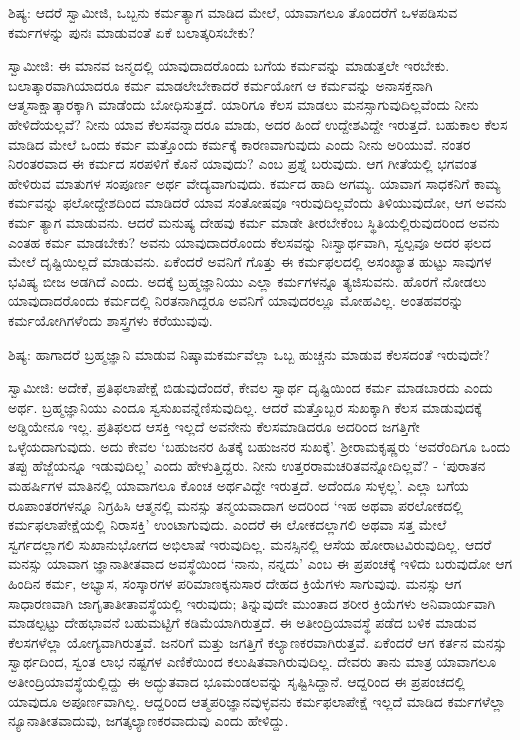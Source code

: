 ಶಿಷ್ಯ: ಆದರೆ ಸ್ವಾಮೀಜಿ, ಒಬ್ಬನು ಕರ್ಮತ್ಯಾಗ ಮಾಡಿದ ಮೇಲೆ, ಯಾವಾಗಲೂ ತೊಂದರೆಗೆ ಒಳಪಡಿಸುವ ಕರ್ಮಗಳನ್ನು ಪುನಃ ಮಾಡುವಂತೆ ಏಕೆ ಬಲಾತ್ಕರಿಸಬೇಕು?

ಸ್ವಾಮೀಜಿ: ಈ ಮಾನವ ಜನ್ಮದಲ್ಲಿ ಯಾವುದಾದರೊಂದು ಬಗೆಯ ಕರ್ಮವನ್ನು ಮಾಡುತ್ತಲೇ ಇರಬೇಕು. ಬಲಾತ್ಕಾರವಾಗಿಯಾದರೂ ಕರ್ಮ ಮಾಡಲೇಬೇಕಾದರೆ ಕರ್ಮಯೋಗ ಆ ಕರ್ಮವನ್ನು ಅನಾಸಕ್ತನಾಗಿ ಆತ್ಮಸಾಕ್ಷಾತ್ಕಾರಕ್ಕಾಗಿ ಮಾಡೆಂದು ಬೋಧಿಸುತ್ತದೆ. ಯಾರಿಗೂ ಕೆಲಸ ಮಾಡಲು ಮನಸ್ಸಾಗುವುದಿಲ್ಲವೆಂದು ನೀನು ಹೇಳಿದೆಯಲ್ಲವೆ? ನೀನು ಯಾವ ಕೆಲಸವನ್ನಾದರೂ ಮಾಡು, ಅದರ ಹಿಂದೆ ಉದ್ದೇಶವಿದ್ದೇ ಇರುತ್ತದೆ. ಬಹುಕಾಲ ಕೆಲಸ ಮಾಡಿದ ಮೇಲೆ ಒಂದು ಕರ್ಮ ಮತ್ತೊಂದು ಕರ್ಮಕ್ಕೆ ಕಾರಣವಾಗುವುದು ಎಂದು ನೀನು ಅರಿಯುವೆ. ನಂತರ ನಿರಂತರವಾದ ಈ ಕರ್ಮದ ಸರಪಳಿಗೆ ಕೊನೆ ಯಾವುದು? ಎಂಬ ಪ್ರಶ್ನೆ ಬರುವುದು. ಆಗ ಗೀತೆಯಲ್ಲಿ ಭಗವಂತ ಹೇಳಿರುವ ಮಾತುಗಳ ಸಂಪೂರ್ಣ ಅರ್ಥ ವೇದ್ಯವಾಗುವುದು. ಕರ್ಮದ ಹಾದಿ ಅಗಮ್ಯ. ಯಾವಾಗ ಸಾಧಕನಿಗೆ ಕಾಮ್ಯ ಕರ್ಮವನ್ನು ಫಲೋದ್ದೇಶದಿಂದ ಮಾಡಿದರೆ ಯಾವ ಸಂತೋಷವೂ ಇರುವುದಿಲ್ಲವೆಂದು ತಿಳಿಯುವುದೋ, ಆಗ ಅವನು ಕರ್ಮ ತ್ಯಾಗ ಮಾಡುವನು. ಆದರೆ ಮನುಷ್ಯ ದೇಹವು ಕರ್ಮ ಮಾಡೇ ತೀರಬೇಕೆಂಬ ಸ್ಥಿತಿಯಲ್ಲಿರುವುದರಿಂದ ಅವನು ಎಂತಹ ಕರ್ಮ ಮಾಡಬೇಕು? ಅವನು ಯಾವುದಾದರೊಂದು ಕೆಲಸವನ್ನು ನಿಃಸ್ವಾರ್ಥವಾಗಿ, ಸ್ವಲ್ಪವೂ ಅದರ ಫಲದ ಮೇಲೆ ದೃಷ್ಟಿಯಿಲ್ಲದೆ ಮಾಡುವನು. ಏಕೆಂದರೆ ಅವನಿಗೆ ಗೊತ್ತು ಈ ಕರ್ಮಫಲದಲ್ಲಿ ಅಸಂಖ್ಯಾತ ಹುಟ್ಟು ಸಾವುಗಳ ಭವಿಷ್ಯ ಬೀಜ ಅಡಗಿದೆ ಎಂದು. ಅದಕ್ಕೆ ಬ್ರಹ್ಮಜ್ಞಾನಿಯು ಎಲ್ಲಾ ಕರ್ಮಗಳನ್ನೂ ತ್ಯಜಿಸುವನು. ಹೊರಗೆ ನೋಡಲು ಯಾವುದಾದರೊಂದು ಕರ್ಮದಲ್ಲಿ ನಿರತನಾಗಿದ್ದರೂ ಅವನಿಗೆ ಯಾವುದರಲ್ಲೂ ಮೋಹವಿಲ್ಲ. ಅಂತಹವರನ್ನು ಕರ್ಮಯೋಗಿಗಳೆಂದು ಶಾಸ್ತ್ರಗಳು ಕರೆಯುವುವು.

ಶಿಷ್ಯ: ಹಾಗಾದರೆ ಬ್ರಹ್ಮಜ್ಞಾನಿ ಮಾಡುವ ನಿಷ್ಕಾಮಕರ್ಮವೆಲ್ಲಾ ಒಬ್ಬ ಹುಚ್ಚನು ಮಾಡುವ ಕೆಲಸದಂತೆ ಇರುವುದೇ?

ಸ್ವಾಮೀಜಿ: ಅದೇಕೆ, ಪ್ರತಿಫಲಾಪೇಕ್ಷೆ ಬಿಡುವುದೆಂದರೆ, ಕೇವಲ ಸ್ವಾರ್ಥ ದೃಷ್ಟಿಯಿಂದ ಕರ್ಮ ಮಾಡಬಾರದು ಎಂದು ಅರ್ಥ. ಬ್ರಹ್ಮಜ್ಞಾನಿಯು ಎಂದೂ ಸ್ವಸುಖವನ್ನೆಣಿಸುವುದಿಲ್ಲ. ಆದರೆ ಮತ್ತೊಬ್ಬರ ಸುಖಕ್ಕಾಗಿ ಕೆಲಸ ಮಾಡುವುದಕ್ಕೆ ಅಡ್ಡಿಯೇನೂ ಇಲ್ಲ. ಪ್ರತಿಫಲದ ಆಸಕ್ತಿ ಇಲ್ಲದೆ ಅವನೇನು ಕೆಲಸಮಾಡಿದರೂ ಅದರಿಂದ ಜಗತ್ತಿಗೇ ಒಳ್ಳೆಯದಾಗುವುದು. ಅದು ಕೇವಲ ‘ಬಹುಜನರ ಹಿತಕ್ಕೆ ಬಹುಜನರ ಸುಖಕ್ಕೆ’. ಶ‍್ರೀರಾಮಕೃಷ್ಣರು ‘ಅವರೆಂದಿಗೂ ಒಂದು ತಪ್ಪು ಹೆಜ್ಜೆಯನ್ನೂ ಇಡುವುದಿಲ್ಲ’ ಎಂದು ಹೇಳುತ್ತಿದ್ದರು. ನೀನು ಉತ್ತರರಾಮಚರಿತವನ್ನೋದಿಲ್ಲವೆ? - ‘ಪುರಾತನ ಮಹರ್ಷಿಗಳ ಮಾತಿನಲ್ಲಿ ಯಾವಾಗಲೂ ಕೊಂಚ ಅರ್ಥವಿದ್ದೇ ಇರುತ್ತದೆ. ಅದೆಂದೂ ಸುಳ್ಳಲ್ಲ’. ಎಲ್ಲಾ ಬಗೆಯ ರೂಪಾಂತರಗಳನ್ನೂ ನಿಗ್ರಹಿಸಿ ಆತ್ಮನಲ್ಲಿ ಮನಸ್ಸು ತನ್ಮಯವಾದಾಗ ಅದರಿಂದ ‘ಇಹ ಅಥವಾ ಪರಲೋಕದಲ್ಲಿ ಕರ್ಮಫಲಾಪೇಕ್ಷೆಯಲ್ಲಿ ನಿರಾಸಕ್ತಿ’ ಉಂಟಾಗುವುದು. ಎಂದರೆ ಈ ಲೋಕದಲ್ಲಾಗಲಿ ಅಥವಾ ಸತ್ತ ಮೇಲೆ ಸ್ವರ್ಗದಲ್ಲಾಗಲಿ ಸುಖಾನುಭೋಗದ ಅಭಿಲಾಷೆ ಇರುವುದಿಲ್ಲ. ಮನಸ್ಸಿನಲ್ಲಿ ಆಸೆಯ ಹೋರಾಟವಿರುವುದಿಲ್ಲ. ಆದರೆ ಮನಸ್ಸು ಯಾವಾಗ ಜ್ಞಾನಾತೀತವಾದ ಅವಸ್ಥೆಯಿಂದ ‘ನಾನು, ನನ್ನದು’ ಎಂಬ ಈ ಪ್ರಪಂಚಕ್ಕೆ ಇಳಿದು ಬರುವುದೋ ಆಗ ಹಿಂದಿನ ಕರ್ಮ, ಅಭ್ಯಾಸ, ಸಂಸ್ಕಾರಗಳ ಪರಿಮಾಣಕ್ಕನುಸಾರ ದೇಹದ ಕ್ರಿಯೆಗಳು ಸಾಗುವುವು. ಮನಸ್ಸು ಆಗ ಸಾಧಾರಣವಾಗಿ ಜಾಗೃತಾತೀತಾವಸ್ಥೆಯಲ್ಲಿ ಇರುವುದು; ತಿನ್ನುವುದೇ ಮುಂತಾದ ಶರೀರ ಕ್ರಿಯೆಗಳು ಅನಿವಾರ್ಯವಾಗಿ ಮಾಡಲ್ಪಟ್ಟು ದೇಹಭಾವನೆ ಬಹುಮಟ್ಟಿಗೆ ಕಡಿಮೆಯಾಗಿರುತ್ತದೆ. ಈ ಅತೀಂದ್ರಿಯಾವಸ್ಥೆ ಪಡೆದ ಬಳಿಕ ಮಾಡುವ ಕೆಲಸಗಳೆಲ್ಲಾ ಯೋಗ್ಯವಾಗಿರುತ್ತವೆ. ಜನರಿಗೆ ಮತ್ತು ಜಗತ್ತಿಗೆ ಕಲ್ಯಾಣಕರವಾಗಿರುತ್ತವೆ. ಏಕೆಂದರೆ ಆಗ ಕರ್ತನ ಮನಸ್ಸು ಸ್ವಾರ್ಥದಿಂದ, ಸ್ವಂತ ಲಾಭ ನಷ್ಟಗಳ ಎಣಿಕೆಯಿಂದ ಕಲುಷಿತವಾಗಿರುವುದಿಲ್ಲ. ದೇವರು ತಾನು ಮಾತ್ರ ಯಾವಾಗಲೂ ಅತೀಂದ್ರಿಯಾವಸ್ಥೆಯಲ್ಲಿದ್ದು ಈ ಅದ್ಭುತವಾದ ಭೂಮಂಡಲವನ್ನು ಸೃಷ್ಟಿಸಿದ್ದಾನೆ. ಆದ್ದರಿಂದ ಈ ಪ್ರಪಂಚದಲ್ಲಿ ಯಾವುದೂ ಅಪೂರ್ಣವಾಗಿಲ್ಲ. ಆದ್ದರಿಂದ ಆತ್ಮಪರಿಜ್ಞಾನವುಳ್ಳವನು ಕರ್ಮಫಲಾಪೇಕ್ಷೆ ಇಲ್ಲದೆ ಮಾಡಿದ ಕರ್ಮಗಳೆಲ್ಲಾ ನ್ಯೂನಾತೀತವಾದುವು, ಜಗತ್ಕಲ್ಯಾಣಕರವಾದುವು ಎಂದು ಹೇಳಿದ್ದು.

